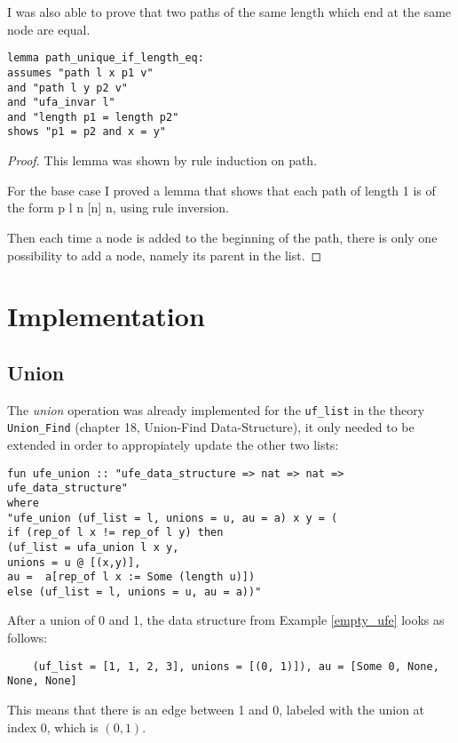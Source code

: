I was also able to prove that two paths of the same length which end at the same node are equal. 

\begin{lstlisting}
lemma path_unique_if_length_eq:
assumes "path l x p1 v"
and "path l y p2 v"
and "ufa_invar l"
and "length p1 = length p2"
shows "p1 = p2 and x = y"
\end{lstlisting}

\begin{proof}
This lemma was shown by rule induction on path. 

For the base case I proved a lemma that shows that each path of length 1 is of the form p l n [n] n, using rule inversion.

Then each time a node is added to the beginning of the path, there is only one possibility to add a node, namely its parent in the list.
\end{proof}


\section{Implementation}

\subsection{Union}

The \emph{union} operation was already implemented for the \lstinline{uf_list} in the theory \lstinline{Union_Find} \cite{Sep} (chapter 18, Union-Find Data-Structure), it only needed to be extended in order to appropiately update the other two lists:

\begin{lstlisting}
fun ufe_union :: "ufe_data_structure => nat => nat => ufe_data_structure"
where
"ufe_union (uf_list = l, unions = u, au = a) x y = (
if (rep_of l x != rep_of l y) then
(uf_list = ufa_union l x y, 
unions = u @ [(x,y)],
au =  a[rep_of l x := Some (length u)])
else (uf_list = l, unions = u, au = a))"
\end{lstlisting}

\begin{exmp}
After a union of 0 and 1, the data structure from Example \ref{empty_ufe} looks as follows:
\begin{lstlisting}
	(uf_list = [1, 1, 2, 3], unions = [(0, 1)]), au = [Some 0, None, None, None]
\end{lstlisting}
This means that there is an edge between 1 and 0, labeled with the union at index 0, which is $(0,1)$.
\end{exmp}

